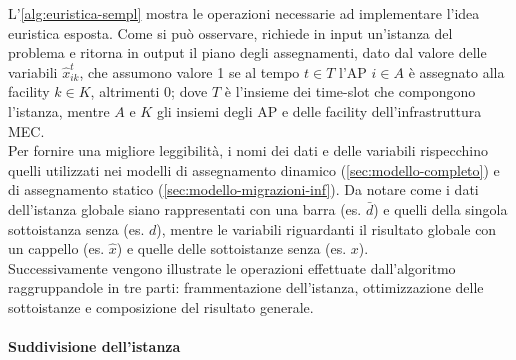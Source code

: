 L'\autoref{alg:euristica-sempl} mostra le operazioni necessarie ad implementare l'idea euristica esposta. Come si può osservare, richiede in input un'istanza del problema e ritorna in output il piano degli assegnamenti, dato dal valore delle variabili $\hat{x}^t_{ik}$, che assumono valore 1 se al tempo $t \in T$ l'AP $i \in A$ è assegnato alla facility $k \in K$, altrimenti 0; dove $T$ è l'insieme dei time-slot che compongono l'istanza, mentre $A$ e $K$ gli insiemi degli AP e delle facility dell'infrastruttura MEC.\\
Per fornire una migliore leggibilità, i nomi dei dati e delle variabili rispecchino quelli utilizzati nei modelli di assegnamento dinamico (\autoref{sec:modello-completo}) e di assegnamento statico (\autoref{sec:modello-migrazioni-inf}). Da notare come i dati dell'istanza globale siano rappresentati con una barra (es. $\bar{d}$) e quelli della singola sottoistanza senza (es. $d$), mentre le variabili riguardanti il risultato globale con un cappello (es. $\hat{x}$) e quelle delle sottoistanze senza (es. $x$).\\
Successivamente vengono illustrate le operazioni effettuate dall'algoritmo raggruppandole in tre parti: frammentazione dell'istanza, ottimizzazione delle sottoistanze e composizione del risultato generale.

\paragraph{Suddivisione dell'istanza}

